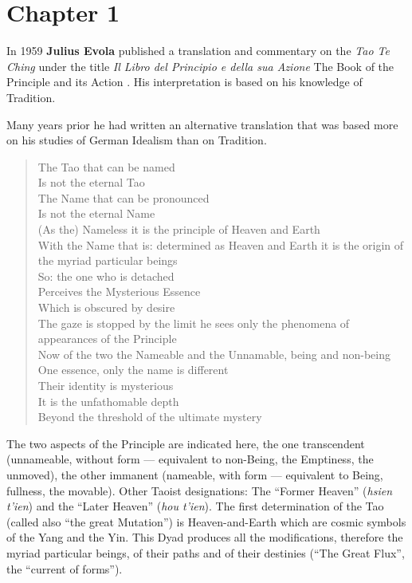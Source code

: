 \section{Chapter 1}

\begin{quotex}
In 1959 \textbf{Julius Evola} published a translation and commentary on the \emph{Tao Te Ching} under the title \emph{Il Libro del Principio e della sua Azione} The Book of the Principle and its Action . His interpretation is based on his knowledge of Tradition.

Many years prior he had written an alternative translation that was based more on his studies of German Idealism than on Tradition.
\end{quotex}


\begin{quotex}
\begin{verse}
The Tao that can be named\\
Is not the eternal Tao\\
The Name that can be pronounced\\
Is not the eternal Name\\
(As the) Nameless it is the principle of Heaven and Earth\\
With the Name that is: determined as Heaven and Earth it is the origin of the myriad particular beings\\
So: the one who is detached\\
Perceives the Mysterious Essence\\
Which is obscured by desire\\
The gaze is stopped by the limit he sees only the phenomena of appearances of the Principle \\
Now of the two the Nameable and the Unnamable, being and non-being \\
One essence, only the name is different\\
Their identity is mysterious\\
It is the unfathomable depth\\
Beyond the threshold of the ultimate mystery
\end{verse}
\end{quotex}


The two aspects of the Principle are indicated here, the one transcendent (unnameable, without form --- equivalent to non-Being, the Emptiness, the unmoved), the other immanent (nameable, with form --- equivalent to Being, fullness, the movable). Other Taoist designations: The ``Former Heaven'' (\emph{hsien t'ien}) and the ``Later Heaven'' (\emph{hou t'ien}). The first determination of the Tao (called also ``the great Mutation'') is Heaven-and-Earth which are cosmic symbols of the Yang and the Yin. This Dyad produces all the modifications, therefore the myriad particular beings, of their paths and of their destinies (``The Great Flux'', the ``current of forms'').

